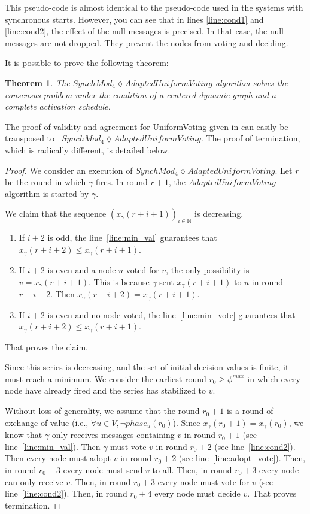 \documentclass[11pt,letterpaper]{article}
\newtheorem{thm}{Theorem}
\newcommand{\cent}{\gamma}
\begin{document}
This pseudo-code is almost identical to the pseudo-code used in the systems with synchronous starts.
However, you can see that in lines \ref{line:cond1} and \ref{line:cond2}, the effect of the null messages is precised.
In that case, the null messages are not dropped. They prevent the nodes from voting and deciding.

It is possible to prove the following theorem:

\begin{thm}
	The $SynchMod_4 \lozenge AdaptedUniformVoting$ algorithm solves the consensus problem under the condition of a centered dynamic graph and a complete activation schedule.
\end{thm}

The proof of validity and agreement for UniformVoting given in \cite{CBS09} can easily be transposed to \newline~$SynchMod_4 \lozenge AdaptedUniformVoting$.
The proof of termination, which is radically different, is detailed below.

\begin{proof}
	We consider an execution of $SynchMod_4 \lozenge AdaptedUniformVoting$.
	Let $r$ be the round in which $\cent$ fires.
	In round $r+1$, the $AdaptedUniformVoting$ algorithm is started by $\cent$.

	We claim that the sequence $(x_\cent(r+i+1))_{i \in \mathds{N}}$ is decreasing.
	\begin{enumerate}
		\item If $i+2$ is odd, the line~\ref{line:min_val} guarantees that $x_\cent(r+i+2) \leq x_\cent(r+i+1)$.
		\item If $i+2$ is even and a node $u$ voted for $v$, the only possibility is $v = x_\cent(r+i+1)$. This is because $\cent$ sent $x_\cent(r+i+1)$ to $u$ in round $r+i+2$.
			Then $x_\cent(r+i+2) = x_\cent(r+i+1)$.
		\item If $i+2$ is even and no node voted, the line~\ref{line:min_vote} guarantees that $x_\cent(r+i+2) \leq x_\cent(r+i+1)$.
	\end{enumerate}
	That proves the claim.

	Since this series is decreasing, and the set of initial decision values is finite, it must reach a minimum.
	We consider the earliest round $r_0 \geq \phi^{max}$ in which every node have already fired and the series has stabilized to $v$.

	Without loss of generality, we assume that the round $r_0+1$ is a round of exchange of value (i.e., $\forall u \in V, \neg phase_u(r_0)$).
	Since $x_\cent(r_0+1) = x_\cent(r_0)$, we know that $\cent$ only receives messages containing $v$ in round $r_0+1$ (see line~\ref{line:min_val}).
	Then $\cent$ must vote $v$ in round $r_0+2$ (see line~\ref{line:cond2}).
	Then every node must adopt $v$ in round $r_0+2$ (see line~\ref{line:adopt_vote}).
	Then, in round $r_0+3$ every node must send $v$ to all.
	Then, in round $r_0+3$ every node can only receive $v$.
	Then, in round $r_0+3$ every node must vote for $v$ (see line~\ref{line:cond2}).
	Then, in round $r_0+4$ every node must decide $v$.
	That proves termination.
\end{proof}
\end{document}
